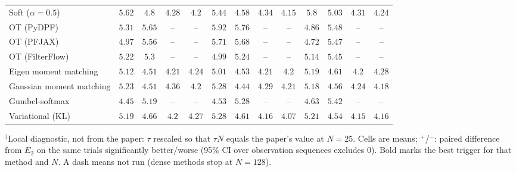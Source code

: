 \begin{table}[ht]
\begin{adjustbox}{max width=\linewidth}
\begin{tabular}{lcccc|cccc|cccc}
Soft ($\alpha{=}0.5$) & $5.62$ & $4.8$ & $\mathbf{4.28}$ & $4.2$ & $\mathbf{5.44}$ & $\mathbf{4.58}$ & $4.34$ & $\mathbf{4.15}$ & $5.8$ & $5.03$ & $4.31$ & $4.24$ \\
OT (PyDPF) & $5.31$ & $5.65$ & -- & -- & $5.92$ & $5.76$ & -- & -- & $\mathbf{4.86}$ & $\mathbf{5.48}$ & -- & -- \\
OT (PFJAX) & $4.97$ & $5.56$ & -- & -- & $5.71$ & $5.68$ & -- & -- & $\mathbf{4.72}$ & $\mathbf{5.47}$ & -- & -- \\
OT (FilterFlow) & $5.22$ & $5.3$ & -- & -- & $\mathbf{4.99}$ & $\mathbf{5.24}$ & -- & -- & $5.14$ & $5.45$ & -- & -- \\
Eigen moment matching & $5.12$ & $\mathbf{4.51}$ & $4.21$ & $4.24$ & $\mathbf{5.01}$ & $4.53$ & $4.21$ & $\mathbf{4.2}$ & $5.19$ & $4.61$ & $\mathbf{4.2}$ & $4.28$ \\
Gaussian moment matching & $5.23$ & $4.51$ & $4.36$ & $4.2$ & $5.28$ & $\mathbf{4.44}$ & $4.29$ & $4.21$ & $\mathbf{5.18}$ & $4.56$ & $\mathbf{4.24}$ & $\mathbf{4.18}$ \\
Gumbel-softmax & $\mathbf{4.45}$ & $\mathbf{5.19}$ & -- & -- & $4.53$ & $5.28$ & -- & -- & $4.63$ & $5.42$ & -- & -- \\
Variational (KL) & $\mathbf{5.19}$ & $4.66$ & $4.2$ & $4.27$ & $5.28$ & $4.61$ & $4.16$ & $\mathbf{4.07}$ & $5.21$ & $\mathbf{4.54}$ & $\mathbf{4.15}$ & $4.16$ \\
\bottomrule
\end{tabular}
\end{adjustbox}
\par\smallskip\parbox{0.95\linewidth}{\footnotesize $^\dagger$Local diagnostic, not from the paper: $\tau$ rescaled so that $\tau N$ equals the paper's value at $N{=}25$. Cells are means; $^{+}$/$^{-}$: paired difference from $E_2$ on the same trials significantly better/worse (95\% CI over observation sequences excludes 0). Bold marks the best trigger for that method and $N$. A dash means not run (dense methods stop at $N{=}128$).}
\end{table}

